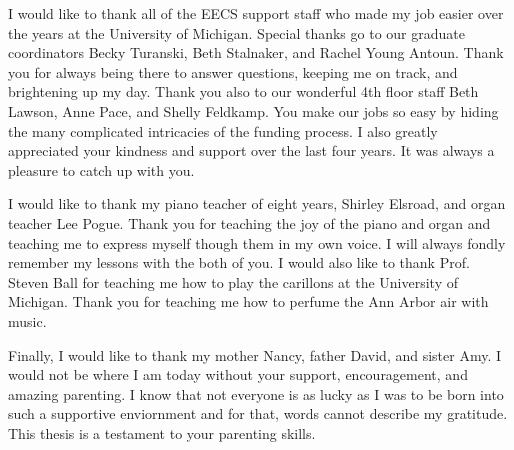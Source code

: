 I would like to thank all of the EECS support staff who made my job easier over the years
at the University of Michigan. Special thanks go to our graduate coordinators Becky
Turanski, Beth Stalnaker, and Rachel Young Antoun. Thank you for always being there to
answer questions, keeping me on track, and brightening up my day. Thank you also to our wonderful
4th floor staff Beth Lawson, Anne Pace, and Shelly Feldkamp. You make our jobs so
easy by hiding the many  complicated intricacies of the funding process. I also
greatly appreciated your kindness and support over the last four years. It was always a
pleasure to catch up with you.

I would like to thank my piano teacher of eight years, Shirley Elsroad, and organ teacher Lee
Pogue. Thank you for teaching the joy of the piano and organ and teaching me to express
myself though them in my own voice. I will always fondly remember my lessons with the both
of you. I would also like to thank Prof. Steven Ball for teaching me how to play the
carillons at the University of Michigan. Thank you for teaching me how to perfume the Ann
Arbor air with music.

Finally, I would like to thank my mother Nancy, father David, and sister Amy. I
would not be where I am today without your support, encouragement, and amazing
parenting. I know that not everyone is as lucky as I was to be born into such a supportive
enviornment and for that, words cannot describe my gratitude. This thesis is a testament
to your parenting skills. 
